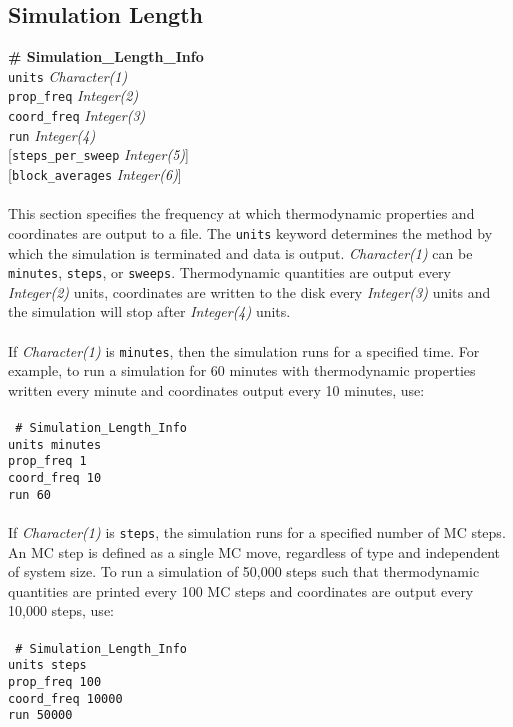 \subsection{Simulation Length}\label{sec:Simulation_Length_Info}
{\bf \# Simulation\_Length\_Info} \\
{\tt units} {\it Character(1)} \\
{\tt prop\_freq} {\it Integer(2)} \\
{\tt coord\_freq} {\it Integer(3)} \\
{\tt run} {\it Integer(4)} \\ 
{[}{\tt steps\_per\_sweep} {\it Integer(5)}] \\
{[}{\tt block\_averages} {\it Integer(6)}] \\ \\
%
This section specifies the frequency at which thermodynamic properties and coordinates are output to a file. 
The \texttt{units} keyword determines the method by which the simulation is terminated and data is output. 
{\it Character(1)} can be {\tt minutes}, {\tt steps}, or {\tt sweeps}. 
Thermodynamic quantities are output every {\it Integer(2)} units,
coordinates are written to the disk every {\it Integer(3)} units and 
the simulation will stop after {\it Integer(4)} units. \\ \\
%
If {\it Character(1)} is {\tt minutes}, then the simulation runs for a specified time.
For example, to run a simulation for 60 minutes with thermodynamic properties written every minute and 
coordinates output every 10 minutes, use: \\ \\
%
\texttt{
\# Simulation\_Length\_Info \\
units         minutes \\
prop\_freq    1 \\
coord\_freq   10 \\
run           60 \\} \\
%
If {\it Character(1)} is {\tt steps}, the simulation runs for a specified number of MC steps.
An MC step is defined as a single MC move, regardless of type and independent of system size. 
To run a simulation of 50,000 steps such that thermodynamic quantities are printed every 100 MC steps and 
coordinates are output every 10,000 steps, use: \\ \\
%
\texttt{
\# Simulation\_Length\_Info \\
units           steps \\
prop\_freq      100 \\
coord\_freq     10000 \\
run             50000 \\ } \\
